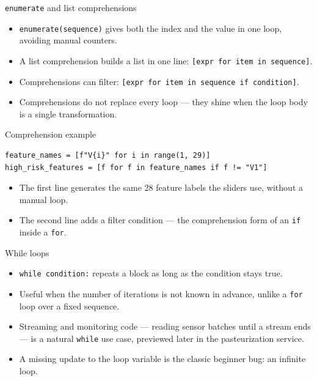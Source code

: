 \begin{frame}{\texttt{enumerate} and list comprehensions}
\begin{itemize}
\item \texttt{enumerate(sequence)} gives both the index and the value in one loop, avoiding manual counters.
\item A list comprehension builds a list in one line: \texttt{[expr for item in sequence]}.
\item Comprehensions can filter: \texttt{[expr for item in sequence if condition]}.
\item Comprehensions do not replace every loop --- they shine when the loop body is a single transformation.
\end{itemize}
\coursefooter
\end{frame}

\begin{frame}[fragile]{Comprehension example}
\begin{lstlisting}[style=coursepython]
feature_names = [f"V{i}" for i in range(1, 29)]
high_risk_features = [f for f in feature_names if f != "V1"]
\end{lstlisting}
\begin{itemize}
\item The first line generates the same 28 feature labels the sliders use, without a manual loop.
\item The second line adds a filter condition --- the comprehension form of an \texttt{if} inside a \texttt{for}.
\end{itemize}
\coursefooter
\end{frame}

\begin{frame}{While loops}
\begin{itemize}
\item \texttt{while condition:} repeats a block as long as the condition stays true.
\item Useful when the number of iterations is not known in advance, unlike a \texttt{for} loop over a fixed sequence.
\item Streaming and monitoring code --- reading sensor batches until a stream ends --- is a natural \texttt{while} use case, previewed later in the pasteurization service.
\item A missing update to the loop variable is the classic beginner bug: an infinite loop.
\end{itemize}
\coursefooter
\end{frame}

